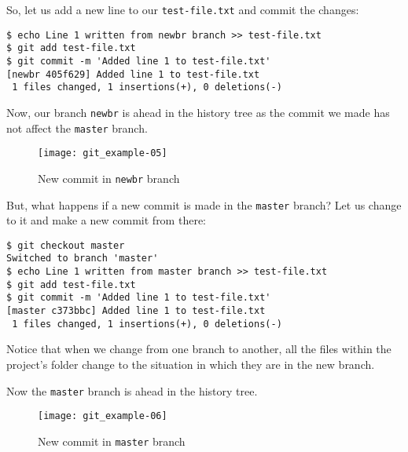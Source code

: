 \documentclass[a4paper,10pt]{article}
\newenvironment{terminal}
  {
    \vspace{+10pt}
    \begin{center}
    \begin{minipage}{0.95\textwidth}
    \begin{framed}
  }
  {
    \end{framed}
    \end{minipage}
    \end{center}
    \vspace{+10pt}
  }
\begin{document}
So, let us add a new line to our \texttt{test-file.txt} and commit the
changes:

\begin{terminal}
\begin{verbatim}
$ echo Line 1 written from newbr branch >> test-file.txt
$ git add test-file.txt
$ git commit -m 'Added line 1 to test-file.txt'
[newbr 405f629] Added line 1 to test-file.txt
 1 files changed, 1 insertions(+), 0 deletions(-)
\end{verbatim}
\end{terminal}


Now, our branch \texttt{newbr} is ahead in the history tree as the
commit we made has not affect the \texttt{master} branch.

\begin{figure}
  \begin{center}
    \texttt{[image: git\_example-05]}
  \end{center}
  \caption{New commit in \texttt{newbr} branch}
\end{figure}

But, what happens if a new commit is made in the \texttt{master}
branch? Let us change to it and make a new commit from there:

\begin{terminal}
\begin{verbatim}
$ git checkout master
Switched to branch 'master'
$ echo Line 1 written from master branch >> test-file.txt
$ git add test-file.txt
$ git commit -m 'Added line 1 to test-file.txt'
[master c373bbc] Added line 1 to test-file.txt
 1 files changed, 1 insertions(+), 0 deletions(-)
\end{verbatim}
\end{terminal}

\begin{tip}
Notice that when we change from one branch to another, all the files
within the project's folder change to the situation in which they are
in the new branch.
\end{tip}

Now the \texttt{master} branch is ahead in the history tree.

\begin{figure}
  \begin{center}
    \texttt{[image: git\_example-06]}
  \end{center}
  \caption{New commit in \texttt{master} branch}
\end{figure}
\end{document}
